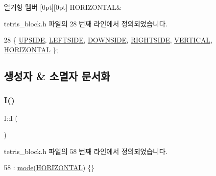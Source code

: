\begin{DoxyEnumFields}{열거형 멤버}
[0pt][0pt]{}\mbox{\label{class_block_a33a96023993478ad4b52426188454765a883bda1b4a0cb6d25d8b3c3465f0cfef}} 
H\+O\+R\+I\+Z\+O\+N\+T\+AL&\\
\hline

\end{DoxyEnumFields}


tetris\+\_\+block.\+h 파일의 28 번째 라인에서 정의되었습니다.


\begin{DoxyCode}
28 \{ \mbox{\hyperlink{class_block_a33a96023993478ad4b52426188454765a4529e89ca1c08cc5f81181e355719fad}{UPSIDE}}, \mbox{\hyperlink{class_block_a33a96023993478ad4b52426188454765a9c855bf91465e7da98901d7900740919}{LEFTSIDE}}, \mbox{\hyperlink{class_block_a33a96023993478ad4b52426188454765a73fd4ad0ff8642235ec8549f9290d13b}{DOWNSIDE}}, \mbox{\hyperlink{class_block_a33a96023993478ad4b52426188454765a005424e665ea0b83edfaf9ddb3ab85a1}{RIGHTSIDE}}, \mbox{\hyperlink{class_block_a33a96023993478ad4b52426188454765a76628d7877667ccb2f6e549b89466a4a}{VERTICAL}}, 
      \mbox{\hyperlink{class_block_a33a96023993478ad4b52426188454765a883bda1b4a0cb6d25d8b3c3465f0cfef}{HORIZONTAL}} \}; 
\end{DoxyCode}


\subsection{생성자 \& 소멸자 문서화}
\mbox{\label{class_i_ae21899806c8e3ea9c22b8ca5f6d1b949}} 
\subsubsection{\texorpdfstring{I()}{I()}}
{\footnotesize\ttfamily I\+::I (\begin{DoxyParamCaption}{ }\end{DoxyParamCaption})\hspace{0.3cm}{\ttfamily [inline]}}



tetris\+\_\+block.\+h 파일의 58 번째 라인에서 정의되었습니다.


\begin{DoxyCode}
58 : \mbox{\hyperlink{class_i_a97884fed99bc779803178b5c3f4bc02d}{mode}}(\mbox{\hyperlink{class_block_a33a96023993478ad4b52426188454765a883bda1b4a0cb6d25d8b3c3465f0cfef}{HORIZONTAL}}) \{\}
\end{DoxyCode}


